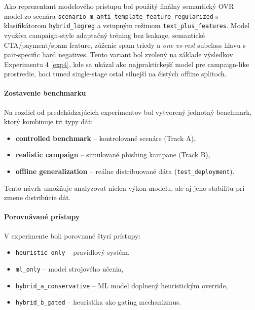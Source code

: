 \documentclass[conference]{IEEEtran}
\begin{document}
Ako reprezentant modelového prístupu bol použitý finálny semantický OVR model zo scenára
\texttt{scenario\_m\_anti\_template\_feature\_regularized} s klasifikátorom
\texttt{hybrid\_logreg} a vstupným režimom \texttt{text\_plus\_features}.
Model využíva campaign-style adaptačný tréning bez leakage, semantické CTA/payment/spam feature,
zúženie spam triedy a \textit{one-vs-rest} subclass hlavu s pair-specific hard negatives.
Tento variant bol zvolený na základe výsledkov Experimentu 4 \ref{exp4}, kde sa ukázal
ako najpraktickejší model pre campaign-like prostredie, hoci tuned single-stage ostal silnejší
na čistých offline splitoch.

\paragraph{Zostavenie benchmarku}

Na rozdiel od predchádzajúcich experimentov bol vytvorený jednotný benchmark,
ktorý kombinuje tri typy dát:

\begin{itemize}
    \item \textbf{controlled benchmark} – kontrolované scenáre (Track A),
    \item \textbf{realistic campaign} – simulované phishing kampane (Track B),
    \item \textbf{offline generalization} – reálne distribuované dáta (\texttt{test\_deployment}).
\end{itemize}

Tento návrh umožňuje analyzovať nielen výkon modelu,
ale aj jeho stabilitu pri zmene distribúcie dát.

\paragraph{Porovnávané prístupy}

V experimente boli porovnané štyri prístupy:

\begin{itemize}
    \item \texttt{heuristic\_only} – pravidlový systém,
    \item \texttt{ml\_only} – model strojového učenia,
    \item \texttt{hybrid\_a\_conservative} – ML model doplnený heuristickým override,
    \item \texttt{hybrid\_b\_gated} – heuristika ako gating mechanizmus.
\end{itemize}
\end{document}
